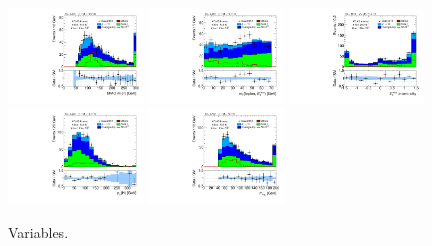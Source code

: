 \begin{figure}[tp]
  \includegraphics[width=0.32\textwidth]{figures/analysis/vbf-topCR/mMMC}
  \includegraphics[width=0.32\textwidth]{figures/analysis/vbf-topCR/mT}
  \includegraphics[width=0.32\textwidth]{figures/analysis/vbf-topCR/met-phi-centrality}
  \includegraphics[width=0.32\textwidth]{figures/analysis/vbf-topCR/H-pt-hi}
  \includegraphics[width=0.32\textwidth]{figures/analysis/vbf-topCR/mvis}
  \caption{Variables.}
  \label{fig:backgrounds-topCR-taus}
\end{figure}

